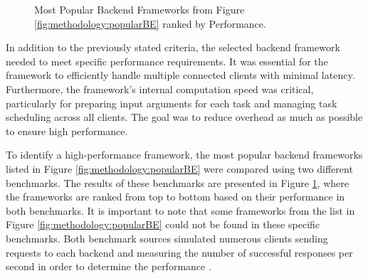 \begin{figure}[htbp] \ContinuedFloat
  \myfloatalign
\caption{Most Popular Backend Frameworks from Figure \ref{fig:methodology:popularBE} ranked by Performance.}
\label{fig:methodology:benchmarkBE}
\end{figure}
In addition to the previously stated criteria, the selected backend framework needed to meet specific performance requirements. It was essential for the framework to efficiently handle multiple connected clients with minimal latency. Furthermore, the framework's internal computation speed was critical, particularly for preparing input arguments for each task and managing task scheduling across all clients. The goal was to reduce overhead as much as possible to ensure high performance.

To identify a high-performance framework, the most popular backend frameworks listed in Figure \ref{fig:methodology:popularBE} were compared using two different benchmarks. The results of these benchmarks are presented in Figure \ref{fig:methodology:benchmarkBE}, where the frameworks are ranked from top to bottom based on their performance in both benchmarks. It is important to note that some frameworks from the list in Figure \ref{fig:methodology:popularBE} could not be found in these specific benchmarks. Both benchmark sources simulated numerous clients sending requests to each backend and measuring the number of successful responses per second in order to determine the performance \cite{backend:benchmark1, backend:benchmark2}.

